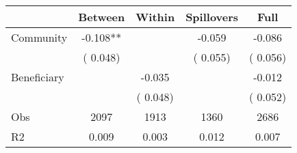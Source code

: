 
\begin{tabular}{l*{4}{c}}\hline&\multicolumn{1}{c}{Between}&\multicolumn{1}{c}{Within}&\multicolumn{1}{c}{Spillovers}&\multicolumn{1}{c}{Full}\\ \hline
 Community             &             -0.108**      &                                               &       -0.059 &        -0.086                            \\ 
                               &        (       0.048)           &                                       &       (       0.055)     &      (       0.056)                                           \\ 
 Beneficiary   &                                               &       -0.035    &                                &            -0.012                            \\ 
                               &                                               & (       0.048)                  &                                        &      (       0.052)                                           \\ 
\hline                                                                                                                                                                                                                                            
 Obs                   &               2097               &       1913                       &       1360                &              2686                                               \\ 
 R2                    &                      0.009              &              0.003                      &              0.012               &                     0.007                                              \\ 
\hline \end{tabular}                                                                                                                                                                                                              